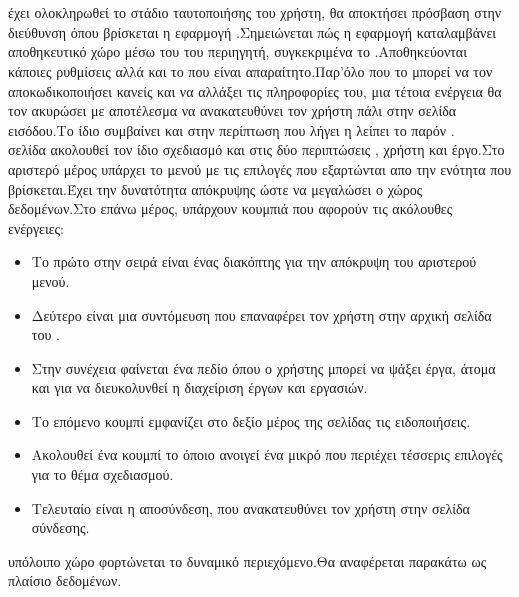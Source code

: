 \section{}
 έχει ολοκληρωθεί το στάδιο ταυτοποιήσης του χρήστη, θα αποκτήσει πρόσβαση στην διεύθυνση  όπου βρίσκεται η εφαρμογή .Σημειώνεται πώς η εφαρμογή καταλαμβάνει αποθηκευτικό χώρο μέσω του  του περιηγητή, συγκεκριμένα το .Αποθηκεύονται κάποιες ρυθμίσεις αλλά και το  που είναι απαραίτητο.Παρ'όλο που το  μπορεί να τον αποκωδικοποιήσει κανείς και να αλλάξει τις πληροφορίες του, μια τέτοια ενέργεια θα τον ακυρώσει με αποτέλεσμα να ανακατευθύνει τον χρήστη πάλι στην σελίδα εισόδου.Το ίδιο συμβαίνει και στην περίπτωση που λήγει η λείπει το παρόν .\\
 σελίδα ακολουθεί τον ίδιο σχεδιασμό και στις δύο περιπτώσεις , χρήστη και έργο.Στο αριστερό μέρος υπάρχει το μενού με τις επιλογές που εξαρτώνται απο την ενότητα που βρίσκεται.Έχει την δυνατότητα απόκρυψης ώστε να μεγαλώσει ο χώρος δεδομένων.Στο επάνω μέρος, υπάρχουν κουμπιά που αφορούν τις ακόλουθες ενέργειες:\\
\begin{itemize}
	\item Το πρώτο στην σειρά είναι ένας διακόπτης για την απόκρυψη του αριστερού μενού.
	\item Δεύτερο είναι μια συντόμευση που επαναφέρει τον χρήστη στην αρχική σελίδα του .
	\item Στην συνέχεια φαίνεται ένα πεδίο  όπου ο χρήστης μπορεί να ψάξει έργα, άτομα και  για να διευκολυνθεί η διαχείριση έργων και εργασιών.
	\item Το επόμενο κουμπί εμφανίζει στο δεξίο μέρος της σελίδας τις ειδοποιήσεις.
	\item Ακολουθεί ένα κουμπί το όποιο ανοιγεί ένα μικρό  που περιέχει τέσσερις επιλογές για το θέμα σχεδιασμού.
	\item Τελευταίο είναι η αποσύνδεση, που ανακατευθύνει τον χρήστη στην σελίδα σύνδεσης.
\end{itemize}
 υπόλοιπο χώρο φορτώνεται το δυναμικό περιεχόμενο.Θα αναφέρεται παρακάτω ως πλαίσιο δεδομένων.

